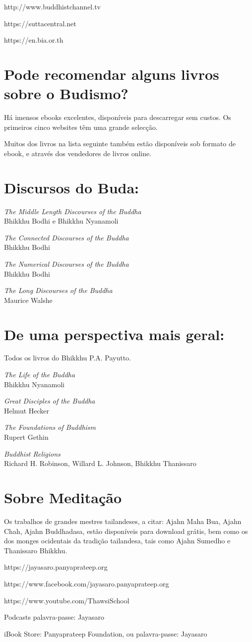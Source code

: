http://www.buddhistchannel.tv

https://suttacentral.net

https://en.bia.or.th

\section{Pode recomendar alguns livros sobre o Budismo?}

Há imensos ebooks excelentes, disponíveis para descarregar sem custos.
Os primeiros cinco websites têm uma grande selecção.

Muitos dos livros na lista seguinte também estão disponíveis sob formato
de ebook, e através dos vendedores de livros online.

\section{Discursos do Buda:}

\emph{The Middle Length Discourses of the Buddha}\\
Bhikkhu Bodhi e Bhikkhu Nyanamoli

\emph{The Connected Discourses of the Buddha}\\
Bhikkhu Bodhi

\emph{The Numerical Discourses of the Buddha}\\
Bhikkhu Bodhi

\emph{The Long Discourses of the Buddha}\\
Maurice Walshe

\section{De uma perspectiva mais geral:}

Todos os livros do Bhikkhu P.A. Payutto.

\emph{The Life of the Buddha}\\
Bhikkhu Nyanamoli

\emph{Great Disciples of the Buddha}\\
Helmut Hecker

\emph{The Foundations of Buddhism}\\
Rupert Gethin

\emph{Buddhist Religions}\\
Richard H. Robinson, Willard L. Johnson, Bhikkhu Thanissaro

\section{Sobre Meditação}

Os trabalhos de grandes mestres tailandeses, a citar: Ajahn Maha Bua,
Ajahn Chah, Ajahn Buddhadasa, estão disponíveis para download grátis,
bem como os dos monges ocidentais da tradição tailandesa, tais como
Ajahn Sumedho e Thanissaro Bhikkhu.

https://jayasaro.panyaprateep.org

https://www.facebook.com/jayasaro.panyaprateep.org

https://www.youtube.com/ThawsiSchool

Podcasts palavra-passe: Jayasaro

iBook Store: Panyaprateep Foundation, ou palavra-passe: Jayasaro

